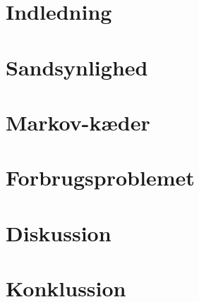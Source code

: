 

 




\chapter{Indledning} 
    

\chapter{Sandsynlighed}\label{kapitel:sandsynlighed}


%

\chapter{Markov-kæder}\label{Kap:MArkov-kæder}

\chapter{Forbrugsproblemet}

\chapter{Diskussion}

\chapter{Konklussion}








